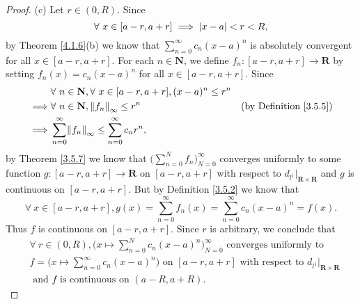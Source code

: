 \begin{proof}{(c)}
    Let \(r \in (0, R)\).
    Since
    \[
        \forall\ x \in [a - r, a + r] \implies \abs*{x - a} < r < R,
    \]
    by Theorem \ref{4.1.6}(b) we know that \(\sum_{n = 0}^\infty c_n (x - a)^n\) is absolutely convergent for all \(x \in [a - r, a + r]\).
    For each \(n \in \mathbf{N}\), we define \(f_n : [a - r, a + r] \to \mathbf{R}\) by setting \(f_n(x) = c_n (x - a)^n\) for all \(x \in [a - r, a + r]\).
    Since
    \begin{align*}
                 & \forall\ n \in \mathbf{N}, \forall\ x \in [a - r, a + r], (x - a)^n \leq r^n                                      \\
        \implies & \forall\ n \in \mathbf{N}, \norm*{f_n}_\infty \leq r^n                       & \text{(by Definition \ref{3.5.5})} \\
        \implies & \sum_{n = 0}^\infty \norm*{f_n}_\infty \leq \sum_{n = 0}^\infty c_n r^n,
    \end{align*}
    by Theorem \ref{3.5.7} we know that \(\big(\sum_{n = 0}^N f_n\big)_{N = 0}^\infty\) converges uniformly to some function \(g : [a - r, a + r] \to \mathbf{R}\) on \([a - r, a + r]\) with respect to \(d_{l^1}|_{\mathbf{R} \times \mathbf{R}}\) and \(g\) is continuous on \([a - r, a + r]\).
    But by Definition \ref{3.5.2} we know that
    \[
        \forall\ x \in [a - r, a + r], g(x) = \sum_{n = 0}^\infty f_n(x) = \sum_{n = 0}^\infty c_n (x - a)^n = f(x).
    \]
    Thus \(f\) is continuous on \([a - r, a + r]\).
    Since \(r\) is arbitrary, we conclude that
    \begin{align*}
         & \forall\ r \in (0, R), \bigg(x \mapsto \sum_{n = 0}^N c_n (x - a)^n\bigg)_{N = 0}^\infty \text{ converges uniformly to }                                \\
         & f = \bigg(x \mapsto \sum_{n = 0}^\infty c_n (x - a)^n\bigg) \text{ on } [a - r, a + r] \text{ with respect to } d_{l^1}|_{\mathbf{R} \times \mathbf{R}} \\
         & \text{ and } f \text{ is continuous on } (a - R, a + R).
    \end{align*}
\end{proof}


